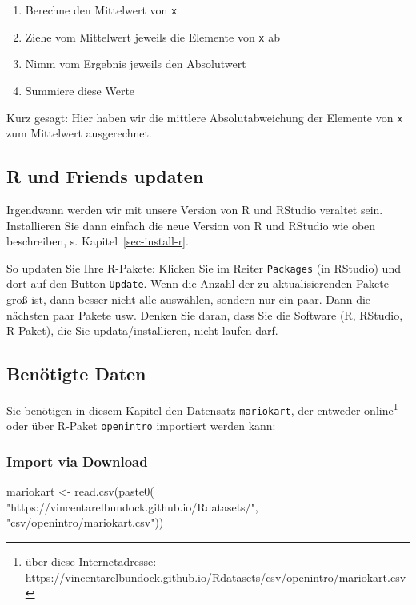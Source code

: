\documentclass[
  letterpaper,
]{scrbook}
\newenvironment{Shaded}{\begin{snugshade}}{\end{snugshade}}
\newcommand{\FunctionTok}[1]{\textcolor[rgb]{0.28,0.35,0.67}{#1}}
\newcommand{\NormalTok}[1]{\textcolor[rgb]{0.00,0.23,0.31}{#1}}
\newcommand{\OtherTok}[1]{\textcolor[rgb]{0.00,0.23,0.31}{#1}}
\newcommand{\StringTok}[1]{\textcolor[rgb]{0.13,0.47,0.30}{#1}}
\providecommand{\tightlist}{%
  \setlength{\itemsep}{0pt}\setlength{\parskip}{0pt}}\usepackage{longtable,booktabs,array}
\theoremstyle{definition}
\theoremstyle{definition}
\theoremstyle{definition}
\theoremstyle{remark}
\begin{document}
\begin{enumerate}
\def\labelenumi{\arabic{enumi}.}
\tightlist
\item
  Berechne den Mittelwert von \texttt{x}
\item
  Ziehe vom Mittelwert jeweils die Elemente von \texttt{x} ab
\item
  Nimm vom Ergebnis jeweils den Absolutwert
\item
  Summiere diese Werte
\end{enumerate}

Kurz gesagt: Hier haben wir die mittlere Absolutabweichung der Elemente
von \texttt{x} zum Mittelwert ausgerechnet.

\subsection{R und Friends updaten}\label{r-und-friends-updaten}

Irgendwann werden wir mit unsere Version von R und RStudio veraltet
sein. Installieren Sie dann einfach die neue Version von R und RStudio
wie oben beschreiben, s. Kapitel~\ref{sec-install-r}.

So updaten Sie Ihre R-Pakete: Klicken Sie im Reiter \texttt{Packages}
(in RStudio) und dort auf den Button \texttt{Update}. Wenn die Anzahl
der zu aktualisierenden Pakete groß ist, dann besser nicht alle
auswählen, sondern nur ein paar. Dann die nächsten paar Pakete usw.
Denken Sie daran, dass Sie die Software (R, RStudio, R-Paket), die Sie
updata/installieren, nicht laufen darf.

\subsection{Benötigte Daten}\label{benuxf6tigte-daten}

Sie benötigen in diesem Kapitel den Datensatz \texttt{mariokart}, der
entweder online\footnote{ über diese Internetadresse:
  \url{https://vincentarelbundock.github.io/Rdatasets/csv/openintro/mariokart.csv}}
oder über R-Paket \texttt{openintro} importiert werden kann:

\subsubsection{Import via Download}\label{import-via-download}

\begin{Shaded}
\begin{Highlighting}[]
\NormalTok{mariokart }\OtherTok{\textless{}{-}} \FunctionTok{read.csv}\NormalTok{(}\FunctionTok{paste0}\NormalTok{(}
  \StringTok{"https://vincentarelbundock.github.io/Rdatasets/"}\NormalTok{,}
  \StringTok{"csv/openintro/mariokart.csv"}\NormalTok{))}
\end{Highlighting}
\end{Shaded}
\end{document}
